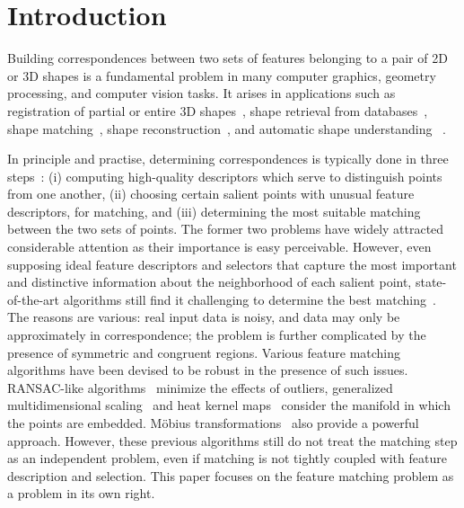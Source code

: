 \section{Introduction}
\label{sec:introduction}

Building correspondences between two sets of features belonging to a pair of 2D or 3D shapes
is a fundamental problem in many computer graphics, geometry processing, and computer vision tasks.
It arises in applications such as
registration of partial or entire 3D shapes~\cite{Gelfand05,Aiger08,li08,Chang09,Zeng10,vanKaick11,Chang11},
shape retrieval from databases~\cite{Bronstein11},
shape matching~\cite{Berg05,Brown07,Lorenzo08,Tevs09,Ovsjanikov10,Tevs11,SahilliogluY11,Windheuser11},
shape reconstruction~\cite{Brown07,Pekelny08,Wand09,Chang11},
and automatic shape understanding~\cite{Lipman09,Sun10,Kim11} .

In principle and practise, determining correspondences is typically done in three steps~\cite{Johnson99,Lowe04,Sun09,Bokeloh08,Toler10,Leutenegger11}:
(i) computing high-quality descriptors which serve to distinguish points from one another,
(ii) choosing certain salient points with unusual feature descriptors, for matching,
and (iii) determining the most suitable matching between the two sets of points.
The former two problems have widely attracted considerable attention as their importance is easy perceivable.
However, even supposing ideal feature descriptors and selectors that capture the most important and distinctive information about the neighborhood of each salient point,
state-of-the-art algorithms  still find it challenging to determine the best matching~\cite{vanKaick11}.
The reasons are various:  real input data is noisy, and data may only be approximately in correspondence;
the problem is further complicated by the presence of symmetric and congruent regions.
Various feature matching algorithms have been devised to be robust in the presence of such issues. RANSAC-like algorithms~\cite{Tevs09,Tevs11}  minimize the effects of outliers,
generalized multidimensional scaling~\cite{Bronstein11} and
heat kernel maps~\cite{Ovsjanikov10}  consider the manifold in which the points are embedded. M{\"o}bius transformations~\cite{Lipman09,Kim11} also provide a powerful approach.
However, these previous algorithms still do not treat the matching step as an independent problem, even if matching is not tightly coupled with feature description and selection.
This paper focuses on the feature matching problem as a problem in its own right.

